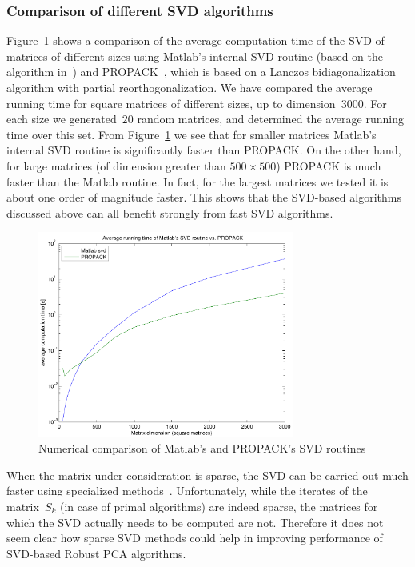 \subsubsection{Comparison of different SVD algorithms}
\label{Algorithms:Discussion:SVD:Comparison:Subsubsec}

Figure~\ref{Algorithms:Discussion:SVD:MatlabVSPropack:figure} shows a comparison of the average computation time of the SVD of matrices of different sizes using Matlab's internal SVD routine (based on the algorithm in~\cite{Demmel:1990vn}) and PROPACK~\cite{Larsen:1998uq}, which is based on a Lanczos bidiagonalization algorithm with partial reorthogonalization. We have compared the average running time for square matrices of different sizes, up to dimension~$3000$. For each size we generated~$20$ random matrices, and determined the average running time over this set. From Figure~\ref{Algorithms:Discussion:SVD:MatlabVSPropack:figure} we see that for smaller matrices Matlab's internal SVD routine is significantly faster than PROPACK. On the other hand, for large matrices (of dimension greater than $500 \times 500$) PROPACK is much faster than the Matlab routine. In fact, for the largest matrices we tested it is about one order of magnitude faster. This shows that the SVD-based algorithms discussed above can all benefit strongly from fast SVD algorithms. 
%
\begin{figure}[htbp]
\centering
\includegraphics[width=0.75\textwidth]{../figures/svd_comparison}
\caption{Numerical comparison of Matlab's and PROPACK's SVD routines}
\label{Algorithms:Discussion:SVD:MatlabVSPropack:figure}
\end{figure}

When the matrix under consideration is sparse, the SVD can be carried out much faster using specialized methods~\cite{Berry:2005uq}. Unfortunately, while the iterates of the matrix~$S_k$ (in case of primal algorithms) are indeed sparse, the matrices for which the SVD actually needs to be computed are not. Therefore it does not seem clear how sparse SVD methods could help in improving performance of SVD-based Robust PCA algorithms. 


